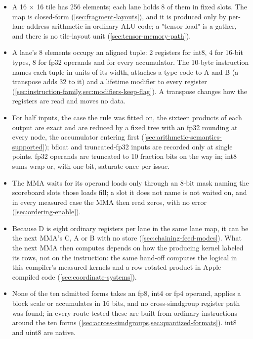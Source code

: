 \begin{itemize}
\item A 16 × 16 tile has 256 elements; each lane holds 8 of them in fixed slots. The map is
  closed-form (\cref{sec:fragment-layouts}), and it is produced only by per-lane address arithmetic in ordinary ALU code; a "tensor
  load" is a gather, and there is no tile-layout unit (\cref{sec:tensor-memory-path}).
\item A lane's 8 elements occupy an aligned tuple: 2 registers for int8, 4 for 16-bit
  types, 8 for fp32 operands and for every accumulator. The 10-byte instruction names each tuple in units of its width,
  attaches a type code to A and B (a transpose adds 32 to it) and a lifetime modifier to every register (\cref{sec:instruction-family,sec:modifiers-keep-flag}). A transpose changes how the registers are read and moves no data.
\item For half inputs, the case the rule was fitted on, the sixteen products of each output are exact
  and are reduced by a fixed tree with an fp32 rounding at every node, the accumulator entering first
  (\cref{sec:arithmetic-semantics-supported}); bfloat and truncated-fp32 inputs are recorded only at single points. fp32
  operands are truncated to 10 fraction bits on the way in; int8 sums wrap or, with one bit, saturate once per issue.
\item The MMA waits for its operand loads only through an 8-bit mask naming the scoreboard slots those loads
  fill; a slot it does not name is not waited on, and in every measured case the MMA then read zeros, with no error
  (\cref{sec:ordering-enable}).
\item Because D is eight ordinary registers per lane in the same lane map, it can be the next MMA's C, A or B with
  no store (\cref{sec:chaining-feed-modes}). What the next MMA then computes depends on how the producing kernel labeled its rows, not on
  the instruction: the same hand-off computes the logical  in this compiler's measured kernels and a row-rotated product
  in Apple-compiled  code (\cref{sec:coordinate-systems}).
\item None of the ten admitted forms takes an fp8, int4 or fp4 operand, applies a
  block scale or accumulates in 16 bits, and no cross-simdgroup register path was found; in every route tested these
  are built from ordinary instructions around the ten forms (\cref{sec:across-simdgroups,sec:quantized-formats}).
  int8 and uint8 are native.
\end{itemize}

